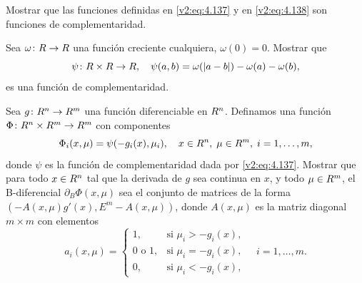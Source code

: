\begin{exercise}\label{v2:ejer:4.5.1}
    Mostrar que las funciones definidas en \eqref{v2:eq:4.137} y en \eqref{v2:eq:4.138} son funciones de complementaridad.
\end{exercise}

\begin{exercise}\label{v2:ejer:4.5.2}
    Sea $\omega \colon R \to R$ una función creciente cualquiera, $\omega(0) = 0$. Mostrar que
    \[
        \psi \colon R \times R \to R, \quad \psi(a, b) = \omega(|a - b|) - \omega(a) - \omega(b),
    \]
    es una función de complementaridad.
\end{exercise}

\begin{exercise}\label{v2:ejer:4.5.3}
    Sea $g \colon R^n \to R^m$ una función diferenciable en $R^n$. Definamos una función $\Phi \colon R^n \times R^m \to R^m$ con componentes
    \[
        \Phi_i(x, \mu) = \psi(-g_i(x), \mu_i), \quad x \in R^n, \; \mu \in R^m, \; i = 1, \dots, m,
    \]
    donde $\psi$ es la función de complementaridad dada por \eqref{v2:eq:4.137}.
    Mostrar que para todo $x \in R^n$ tal que la derivada de $g$ sea continua en $x$, y todo $\mu \in R^m$, el B-diferencial $\partial_B \Phi(x, \mu)$ sea el conjunto de matrices de la forma $(-A(x, \mu)g'(x), E^m - A(x, \mu))$, donde $A(x, \mu)$ es la matriz diagonal $m \times m$ con elementos
    \begin{equation}
        a_i(x, \mu) = \begin{cases}
            1, & \text{si } \mu_i > -g_i(x), \\
            0 \text{ o } 1, & \text{si } \mu_i = -g_i(x), \\
            0, & \text{si } \mu_i < -g_i(x),
        \end{cases} \quad i = 1, \dots, m.
        \label{v2:eq:4.139}
    \end{equation}
\end{exercise}

